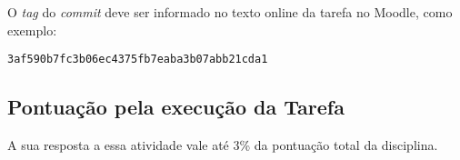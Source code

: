 O \textit{tag} do \textit{commit} deve ser informado no texto online da tarefa no Moodle, como exemplo:
\begin{verbatim}
3af590b7fc3b06ec4375fb7eaba3b07abb21cda1
\end{verbatim}

\subsection{Pontuação pela execução da  Tarefa}

A sua resposta a essa atividade vale até 3\% da pontuação total da disciplina.

